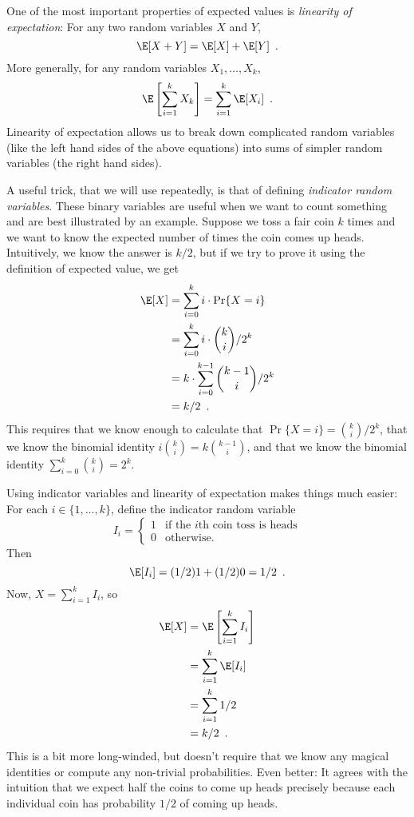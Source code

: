 One of the most important properties of expected values is \emph{linearity
of expectation}:  For any two random variables $X$ and $Y$,
\[
   \E[X+Y] = \E[X] + \E[Y] \enspace .
\]
More generally, for any random variables $X_1,\ldots,X_k$,
\[
   \E\left[\sum_{i=1}^k X_k\right] = \sum_{i=1}^k \E[X_i] \enspace .
\]
Linearity of expectation allows us to break down complicated random variables (like the left hand sides of the above equations) into sums of simpler random variables (the right hand sides).

A useful trick, that we will use repeatedly, is that of defining
\emph{indicator random variables}.  These binary variables are useful
when we want to count something and are best illustrated by an example.
Suppose we toss a fair coin $k$ times and we want to know the expected
number of times the coin comes up heads.  Intuitively, we know the answer
is $k/2$, but if we try to prove it using the definition of expected
value, we get
\begin{align*}
   \E[X] & = \sum_{i=0}^k i\cdot\Pr\{X=i\} \\
         & = \sum_{i=0}^k i\cdot\binom{k}{i}/2^k \\
         & = k\cdot \sum_{i=0}^{k-1}\binom{k-1}{i}/2^k \\
         & = k/2 \enspace .
\end{align*}
This requires that we know enough to calculate that $\Pr\{X=i\}
= \binom{k}{i}/2^k$, that we know the binomial identity
$i\binom{k}{i}=k\binom{k-1}{i}$, and that we know the binomial identity
$\sum_{i=0}^{k} \binom{k}{i} = 2^{k}$.

Using indicator variables and linearity of expectation makes things much easier:  For each $i\in\{1,\ldots,k\}$, define the indicator random variable
\[
    I_i = \begin{cases}
           1 & \text{if the $i$th coin toss is heads} \\
           0 & \text{otherwise.}
          \end{cases}
\]
Then 
\[ \E[I_i] = (1/2)1 + (1/2)0 = 1/2 \enspace . \]
Now, $X=\sum_{i=1}^k I_i$, so
\begin{align*}
   \E[X] & = \E\left[\sum_{i=1}^k I_i\right] \\
         & = \sum_{i=1}^k \E[I_i] \\
         & = \sum_{i=1}^k 1/2 \\
         & = k/2 \enspace .
\end{align*}
This is a bit more long-winded, but doesn't require that we know any
magical identities or compute any non-trivial probabilities. Even better:
It agrees with the intuition that we expect half the coins to come
up heads precisely because each individual coin has probability $1/2$ of coming
up heads.


